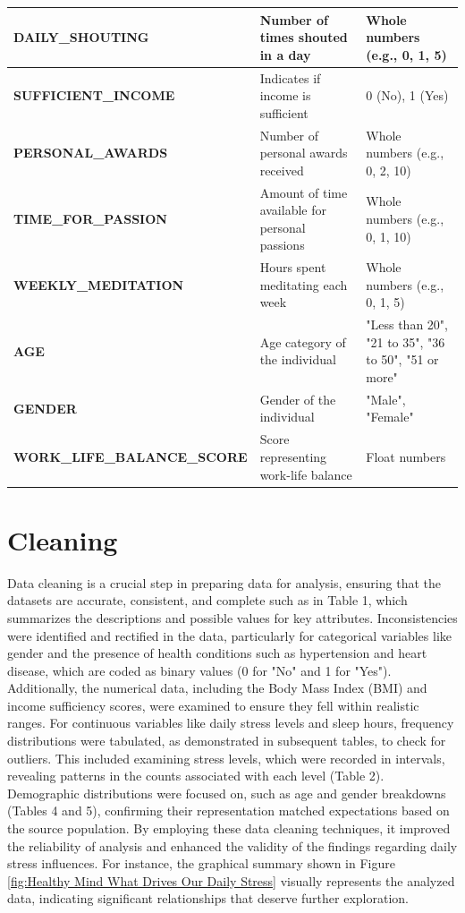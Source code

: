\documentclass[runningheads]{llncs}
\begin{document}
\begin{enumerate}
\begin{table}[ht]
\begin{tabular}{|l|p{5cm}|p{4cm}|}
\hline
\textbf{DAILY\_SHOUTING} & Number of times shouted in a day & Whole numbers (e.g., 0, 1, 5) \\ 
\hline
\textbf{SUFFICIENT\_INCOME} & Indicates if income is sufficient & 0 (No), 1 (Yes) \\ 
\hline
\textbf{PERSONAL\_AWARDS} & Number of personal awards received & Whole numbers (e.g., 0, 2, 10) \\ 
\hline
\textbf{TIME\_FOR\_PASSION} & Amount of time available for personal passions & Whole numbers (e.g., 0, 1, 10) \\ 
\hline
\textbf{WEEKLY\_MEDITATION} & Hours spent meditating each week & Whole numbers (e.g., 0, 1, 5) \\ 
\hline
\textbf{AGE} & Age category of the individual & "Less than 20", "21 to 35", "36 to 50", "51 or more" \\ 
\hline
\textbf{GENDER} & Gender of the individual & "Male", "Female" \\ 
\hline
\textbf{WORK\_LIFE\_BALANCE\_SCORE} & Score representing work-life balance & Float numbers \\ 
\hline
\end{tabular}
\end{table}

\clearpage

\section{Cleaning}
Data cleaning is a crucial step in preparing data for analysis, ensuring that the datasets are accurate, consistent, and complete such as in Table 1, which summarizes the descriptions and possible values for key attributes. Inconsistencies were identified and rectified in the data, particularly for categorical variables like gender and the presence of health conditions such as hypertension and heart disease, which are coded as binary values (0 for "No" and 1 for "Yes"). Additionally, the numerical data, including the Body Mass Index (BMI) and income sufficiency scores, were examined to ensure they fell within realistic ranges. For continuous variables like daily stress levels and sleep hours, frequency distributions were tabulated, as demonstrated in subsequent tables, to check for outliers. This included examining stress levels, which were recorded in intervals, revealing patterns in the counts associated with each level (Table 2). Demographic distributions were focused on, such as age and gender breakdowns (Tables 4 and 5), confirming their representation matched expectations based on the source population. By employing these data cleaning techniques, it improved the reliability of analysis and enhanced the validity of the findings regarding daily stress influences. For instance, the graphical summary shown in Figure \ref{fig:Healthy Mind What Drives Our Daily Stress} visually represents the analyzed data, indicating significant relationships that deserve further exploration.


\end{enumerate}
\end{document}
